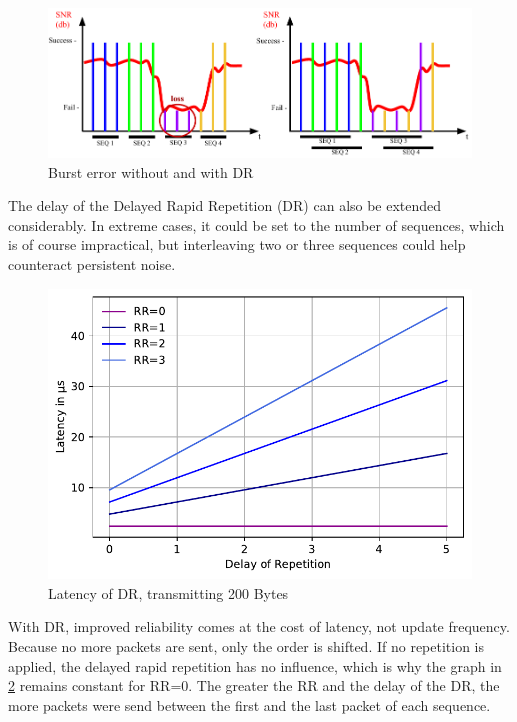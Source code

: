 \begin{figure}[h]
	\centering
	\includegraphics[scale=0.75]{figures/BadChannel.pdf}
	\caption{Burst error without and with DR}
	\label{fig:badChannel}
\end{figure}

The delay of the Delayed Rapid Repetition (DR) can also be extended considerably.
In extreme cases, it could be set to the number of sequences, which is of course impractical,
but interleaving two or three sequences could help counteract persistent noise.

\begin{figure}[h]
	\centering
	\includegraphics[scale=0.60]{../Plot2/Graphs/bc_dr.pdf}
	\caption{Latency of DR, transmitting 200 Bytes}
	\label{fig:dr_delay}
\end{figure}

With DR, improved reliability comes at the cost of latency, not update frequency.
Because no more packets are sent, only the order is shifted.
If no repetition is applied, the delayed rapid repetition has no influence,
which is why the graph in \cref{fig:dr_delay} remains constant for RR=0.
The greater the RR and the delay of the DR, the more packets were send
between the first and the last packet of each sequence.

